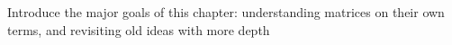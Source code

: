 \documentclass[elementsmain.tex]{subfiles}
\begin{document}
Introduce the major goals of this chapter: understanding matrices on their own terms, and revisiting old ideas with more depth


\clearpage
\end{document}
